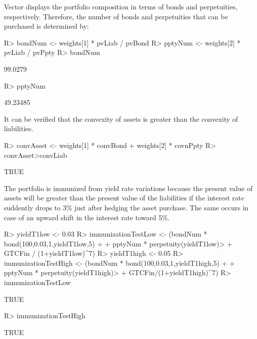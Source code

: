 \documentclass[nojss]{jss}
\begin{document}
Vector  displays the portfolio composition in terms of bonds and
perpetuities, respectively. Therefore, the number of bonds and perpetuities that
can be purchased is determined by: 

\begin{Schunk}
\begin{Sinput}
R> bondNum <- weights[1] * pvLiab / pvBond
R> pptyNum <- weights[2] * pvLiab / pvPpty	
R> bondNum
\end{Sinput}
\begin{Soutput}
[1] 99.0279
\end{Soutput}
\begin{Sinput}
R> pptyNum
\end{Sinput}
\begin{Soutput}
[1] 49.23485
\end{Soutput}
\end{Schunk}

It can be verified that the convexity of assets is greater than the convexity of liabilities.

\begin{Schunk}
\begin{Sinput}
R> convAsset <- weights[1] * convBond + weights[2] * covnPpty
R> convAsset>convLiab
\end{Sinput}
\begin{Soutput}
[1] TRUE
\end{Soutput}
\end{Schunk}

The portfolio is immunized from yield rate variations because the present value of assets will be greater than the present value of the liabilities if the interest rate
suddently drops to 3\% just after hedging the asset purchase. The same occurs in case of an upward shift in the interest rate
toward 5\%.

\begin{Schunk}
\begin{Sinput}
R> yieldT1low <- 0.03
R> immunizationTestLow <- (bondNum * bond(100,0.03,1,yieldT1low,5) + 
+  			pptyNum * perpetuity(yieldT1low)> 
+  			GTCFin / (1+yieldT1low)^7)
R> yieldT1high <- 0.05
R> immunizationTestHigh <- (bondNum * bond(100,0.03,1,yieldT1high,5) + 
+  			pptyNum * perpetuity(yieldT1high)>
+  			GTCFin/(1+yieldT1high)^7)
R> immunizationTestLow
\end{Sinput}
\begin{Soutput}
[1] TRUE
\end{Soutput}
\begin{Sinput}
R> immunizationTestHigh
\end{Sinput}
\begin{Soutput}
[1] TRUE
\end{Soutput}
\end{Schunk}
\end{document}
